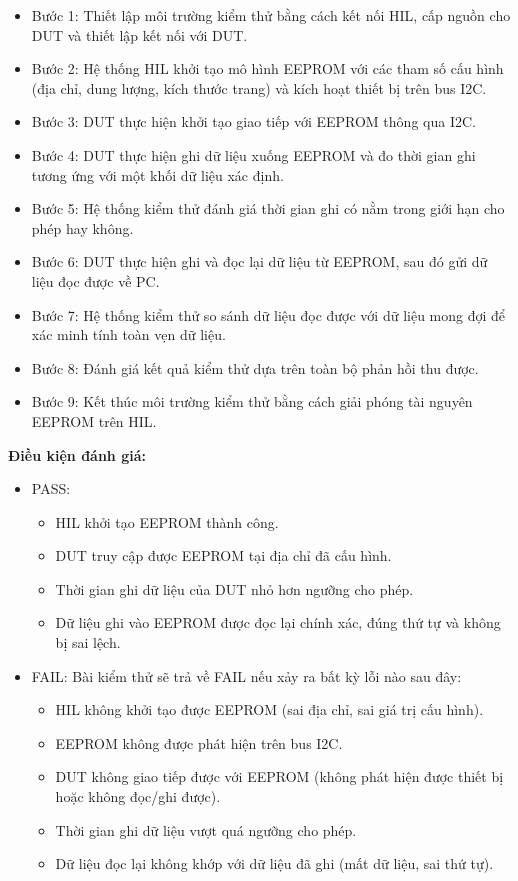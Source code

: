 \begin{itemize}
    \item Bước 1: Thiết lập môi trường kiểm thử bằng cách kết nối HIL, cấp nguồn cho DUT và thiết lập kết nối với DUT.
    \item Bước 2: Hệ thống HIL khởi tạo mô hình EEPROM với các tham số cấu hình (địa chỉ, dung lượng, kích thước trang) và kích hoạt thiết bị trên bus I2C.
    \item Bước 3: DUT thực hiện khởi tạo giao tiếp với EEPROM thông qua I2C.
    \item Bước 4: DUT thực hiện ghi dữ liệu xuống EEPROM và đo thời gian ghi tương ứng với một khối dữ liệu xác định.
    \item Bước 5: Hệ thống kiểm thử đánh giá thời gian ghi có nằm trong giới hạn cho phép hay không.
    \item Bước 6: DUT thực hiện ghi và đọc lại dữ liệu từ EEPROM, sau đó gửi dữ liệu đọc được về PC.
    \item Bước 7: Hệ thống kiểm thử so sánh dữ liệu đọc được với dữ liệu mong đợi để xác minh tính toàn vẹn dữ liệu.
    \item Bước 8: Đánh giá kết quả kiểm thử dựa trên toàn bộ phản hồi thu được.
    \item Bước 9: Kết thúc môi trường kiểm thử bằng cách giải phóng tài nguyên EEPROM trên HIL.
\end{itemize}

\textbf{Điều kiện đánh giá:}

\begin{itemize}
    \item PASS: 
    \begin{itemize}
        \item HIL khởi tạo EEPROM thành công.
        \item DUT truy cập được EEPROM tại địa chỉ đã cấu hình.
        \item Thời gian ghi dữ liệu của DUT nhỏ hơn ngưỡng cho phép.
        \item Dữ liệu ghi vào EEPROM được đọc lại chính xác, đúng thứ tự và không bị sai lệch.
    \end{itemize}

    \item FAIL: Bài kiểm thử sẽ trả về FAIL nếu xảy ra bất kỳ lỗi nào sau đây:
    \begin{itemize}
        \item HIL không khởi tạo được EEPROM (sai địa chỉ, sai giá trị cấu hình).
        \item EEPROM không được phát hiện trên bus I2C.
        \item DUT không giao tiếp được với EEPROM (không phát hiện được thiết bị hoặc không đọc/ghi được).
        \item Thời gian ghi dữ liệu vượt quá ngưỡng cho phép.
        \item Dữ liệu đọc lại không khớp với dữ liệu đã ghi (mất dữ liệu, sai thứ tự).
    \end{itemize}
\end{itemize}


